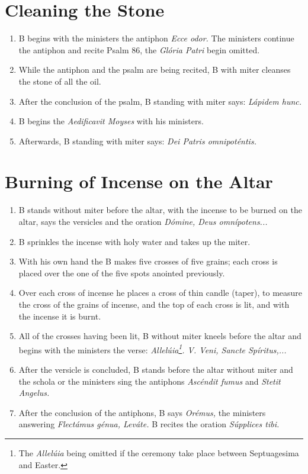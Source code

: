 \documentclass[twocolumn]{report}
\begin{document}
\section*{Cleaning the Stone}
\begin{enumerate}
	\item B begins with the ministers the antiphon \textit{Ecce odor.} The ministers continue the antiphon and recite Psalm 86, the \textit{Glória Patri} begin omitted.
	\item While the antiphon and the psalm are being recited, B with miter cleanses the stone of all the oil.
	\item After the conclusion of the psalm, B standing with miter says: \textit{Lápidem hunc.}
	\item B begins the \textit{Aedificavit Moyses} with his ministers.
	\item Afterwards, B standing with miter says: \textit{Dei Patris omnipoténtis.}
\end{enumerate}
\section*{Burning of Incense on the Altar}
\begin{enumerate}
	\item B stands without miter before the altar, with the incense to be burned on the altar, says the versicles and the oration \textit{Dómine, Deus omnípotens...}
	\item B sprinkles the incense with holy water and takes up the miter.
	\item With his own hand the B makes five crosses of five grains; each cross is placed over the one of the five spots anointed previously.
	\item Over each cross of incense he places a cross of thin candle (taper), to measure the cross of the grains of incense, and the top of each cross is lit, and with the incense it is burnt.
	\item All of the crosses having been lit, B without miter kneels before the altar and begins with the ministers the verse: \textit{Allelúia\footnote{The \textit{Allelúia} being omitted if the ceremony take place between Septuagesima and Easter.}. V. Veni, Sancte Spíritus,...}
	\item After the versicle is concluded, B stands before the altar without miter and the schola or the ministers sing the antiphons \textit{Ascéndit fumus} and \textit{Stetit Angelus.}
	\item After the conclusion of the antiphons, B says \textit{Orémus,} the ministers answering \textit{Flectámus génua, Leváte.} B recites the oration \textit{Súpplices tibi.}
\end{enumerate}
\end{document}
